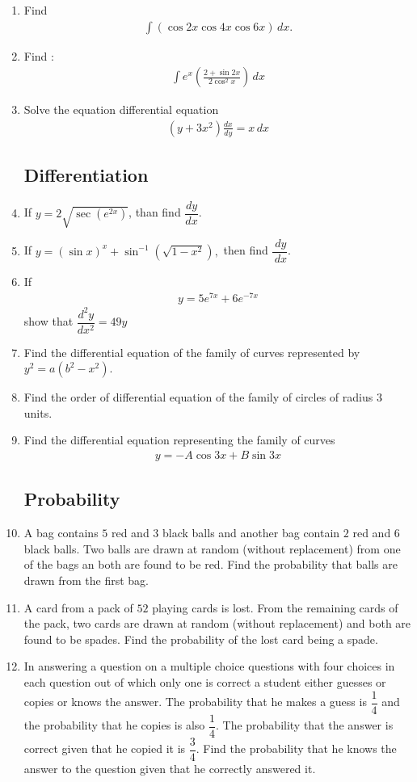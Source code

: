 \documentclass[12pt,-letter paper]{article}
\providecommand{\brak}[1]{\ensuremath{\left(#1\right)}}
\begin{document}
\begin{enumerate}
\item Find
\begin{align*}
\int\brak{\cos2x\cos4x\cos6x} \, dx. 
\end{align*}         
\item Find :
\begin{align*}
\int{e^x\left(\frac{2+\sin 2x}{2\cos^2 x}\right) \, dx}
\end{align*}
\item Solve the equation differential equation \begin{align*}\brak{y+3x^2}\frac{dx}{dy}=x\, dx \end{align*}
\subsection*{Differentiation}
\item If $y=2\sqrt{\sec\brak{e^{2x}}}$, than find $\dfrac{dy}{dx}$.

\item If $ y=\brak{\sin x}^x+\sin^{-1}\brak{\sqrt{1-x^2}},$ then find $\dfrac{\, dy}{\, dx}$.  

\item If \begin{align*}y= 5e^{7x}+6e^{-7x}\end{align*} show that $\dfrac{d^2y}{dx^2}=49y$
\item Find the differential equation of the family of curves represented by $y^2=a\brak{b^2-x^2}$.
\item Find the order of differential equation of the family of circles of radius $3$ units.

\item Find the differential equation representing the family of curves \begin{align*}y= -A\cos 3x+B\sin 3x\end{align*}
\subsection*{ Probability}
\item A bag contains $5$ red and $3$ black balls and another bag contain $2$ red and $6$ black balls. Two balls are drawn at random (without replacement) from one of the bags an both are found to be red. Find the probability that balls are drawn from the first bag.                 
\item A card from a pack of $52$  playing cards is lost. From the remaining cards of the pack, two cards are drawn at random (without replacement) and both are found to be spades. Find the probability of the lost card being a spade. 
\item In answering a question on a multiple choice questions with four choices in each question out of which only one is correct a student either guesses or copies or knows the answer. The probability that he makes a guess is $\dfrac{1}{4}$ and the probability that he copies is also $\dfrac{1}{4}$. The probability that the answer is correct given that he copied it is $\dfrac{3}{4}$. Find the probability that he knows the answer to the question given that he correctly answered it.

\end{enumerate}
\end{document}
